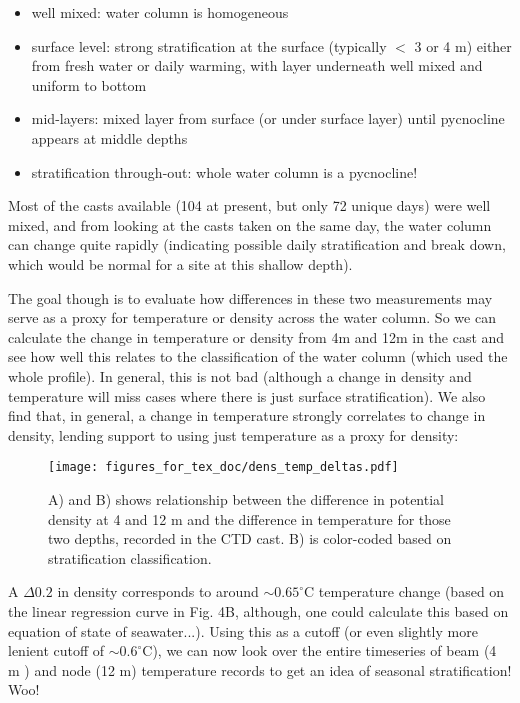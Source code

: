 \documentclass[11pt]{article}
\begin{document}
\begin{itemize}

\item well mixed: water column is homogeneous
\item surface level: strong stratification at the surface (typically $<$ 3 or 4 m) either from fresh water or daily warming, with layer underneath well mixed and uniform to bottom
\item mid-layers: mixed layer from surface (or under surface layer) until pycnocline appears at middle depths 
\item stratification through-out: whole water column is a pycnocline!
\end{itemize}

Most of the casts available (104 at present, but only 72 unique days) were well mixed, and from looking at the casts taken on the same day, the water column can change quite rapidly (indicating possible daily stratification and break down, which would be normal for a site at this shallow depth). 

 The  goal though is to evaluate how differences in these two measurements may serve as a proxy for temperature or density across the water column. So we can calculate the change in temperature or density from 4m and 12m in the cast and see how well this relates to the classification of the water column (which used the whole profile). In general, this is not bad (although a change in density and temperature will miss cases where there is just surface stratification). We also find that, in general, a change in temperature strongly correlates to change in density, lending support to using just temperature as a proxy for density:

 \begin{figure}[h]
\centering
\texttt{[image: figures\_for\_tex\_doc/dens\_temp\_deltas.pdf]}
\caption{A) and B) shows relationship between the difference in potential density at 4 and 12 m and the difference in temperature for those two depths, recorded in the CTD cast. B) is color-coded based on stratification classification.}
\end{figure}


\noindent A $\Delta0.2$ in density corresponds to around $\sim0.65 ^{\circ}$C temperature change (based on the linear regression curve in Fig. 4B, although, one could calculate this based on equation of state of seawater...). Using this as a cutoff (or even slightly more lenient cutoff of $\sim0.6 ^{\circ}$C), we can now look over the entire timeseries of beam (4 m ) and node (12 m) temperature records to get an idea of seasonal stratification! Woo!
\end{document}
